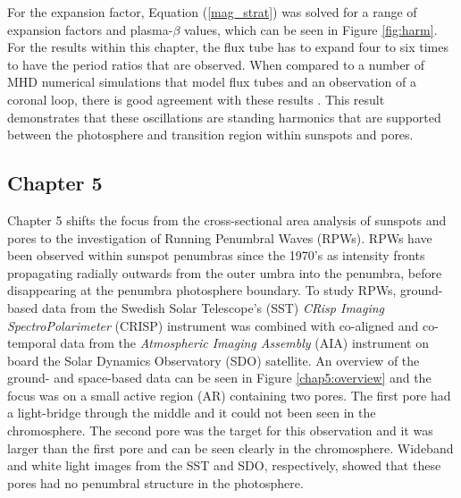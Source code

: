 	For the expansion factor, Equation (\ref{mag_strat}) was solved for a range of expansion factors and plasma-$\beta$ values, which can be seen in Figure \ref{fig:harm}.
	For the results within this chapter, the flux tube has to expand four to six times to have the period ratios that are observed.
	When compared to a number of MHD numerical simulations that model flux tubes and an observation of a coronal loop, there is good agreement with these results \citep{khomenko,fedun2,fedun1,2008A&A...489L..57K}.
	This result demonstrates that these oscillations are standing harmonics that are supported between the photosphere and transition region within sunspots and pores.

	\subsection{Chapter 5}
    
    Chapter 5 shifts the focus from the cross-sectional area analysis of sunspots and pores to the investigation of Running Penumbral Waves (RPWs).
    RPWs have been observed within sunspot penumbras since the 1970's as intensity fronts propagating radially outwards from the outer umbra into the penumbra, before disappearing at the penumbra photosphere boundary.
    To study RPWs, ground-based data from the Swedish Solar Telescope's (SST) \textit{CRisp Imaging SpectroPolarimeter} (CRISP) instrument was combined with co-aligned and co-temporal data from the \textit{Atmospheric Imaging Assembly} (AIA) instrument on board the Solar Dynamics Observatory (SDO) satellite.
    An overview of the ground- and space-based data can be seen in Figure \ref{chap5:overview} and the focus was on a small active region (AR) containing two pores.
    The first pore had a light-bridge through the middle and it could not been seen in the chromosphere.
    The second pore was the target for this observation and it was larger than the first pore and can be seen clearly in the chromosphere. 
    Wideband and white light images from the SST and SDO, respectively, showed that these pores had no penumbral structure in the photosphere.
    
